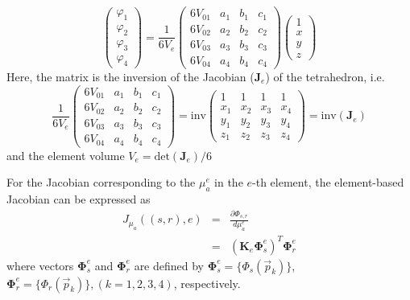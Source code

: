\documentclass{article}
\begin{document}
\begin{equation}
\left(
\begin{array}{l}
\varphi_1\\
\varphi_2\\
\varphi_3\\
\varphi_4
\end{array}\right)=\frac{1}{6V_e}\left(
\begin{array}{llll}
6V_{01} & a_1 & b_1 & c_1 \\
6V_{02} & a_2 & b_2 & c_2 \\
6V_{03} & a_3 & b_3 & c_3 \\
6V_{04} & a_4 & b_4 & c_4 
\end{array}
\right)\left(
\begin{array}{l}
1\\
x\\
y\\
z
\end{array}\right)
\end{equation}
Here, the matrix is the inversion of the Jacobian ($\mathbf{J}_e$) of the tetrahedron, i.e.
\begin{equation}\frac{1}{6V_e}
\left(
\begin{array}{llll}
6V_{01} & a_1 & b_1 & c_1 \\
6V_{02} & a_2 & b_2 & c_2 \\
6V_{03} & a_3 & b_3 & c_3 \\
6V_{04} & a_4 & b_4 & c_4 
\end{array}
\right)=\textrm{inv}\left(
\begin{array}{llll}
1 & 1 & 1 & 1 \\
x_1 & x_2 & x_3 & x_4 \\
y_1 & y_2 & y_3 & y_4 \\
z_1 & z_2 & z_3 & z_4  
\end{array}
\right)=\textrm{inv}(\mathbf{J}_e)
\end{equation}
and the element volume $V_e=\textrm{det}(\mathbf{J}_e)/6$

For the Jacobian corresponding to the $\mu_a^e$ in the $e$-th element, the 
element-based Jacobian can be expressed as
\begin{eqnarray}\nonumber
J_{\mu_a}((s,r),e)&=&\frac{\partial
\Phi_{s,r}}{d\mu_a^{e}}\\&=&\left(\mathbf{K}_e{\boldsymbol\Phi}_s^e\right)^T{\boldsymbol\Phi}_r^e
\end{eqnarray}
where vectors $\boldsymbol{\Phi}_s^e$ and $\boldsymbol{\Phi}_r^e$
are defined by $\boldsymbol{\Phi}_s^e=\{\Phi_s(\vec{p}_k)\}$,
$\boldsymbol{\Phi}_r^e=\{\Phi_r(\vec{p}_k)\}, (k=1,2,3,4)$,
respectively.
\end{document}

